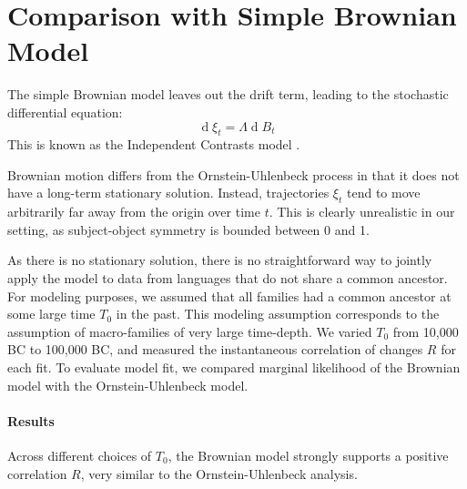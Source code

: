\documentclass[11pt,a4paper]{article}
\begin{document}



\section{Comparison with Simple Brownian Model}

The simple Brownian model leaves out the drift term, leading to the stochastic differential equation:
\begin{equation*}
    \operatorname{d}\xi_t = \Lambda \operatorname{d}B_t
\end{equation*}
This is known as the Independent Contrasts model \citep{felsenstein1973maximum, freckleton2012fast}.

Brownian motion differs from the Ornstein-Uhlenbeck process in that it does not have a long-term stationary solution.
Instead, trajectories $\xi_t$ tend to move arbitrarily far away from the origin over time $t$.
This is clearly unrealistic in our setting, as subject-object symmetry is bounded between 0 and 1.

As there is no stationary solution, there is no straightforward way to jointly apply the model to data from languages that do not share a common ancestor.
For modeling purposes, we assumed that all families had a common ancestor at some large time $T_0$ in the past.
This modeling assumption corresponds to the assumption of macro-families of very large time-depth.
We varied $T_0$ from 10,000 BC to 100,000 BC, and measured the instantaneous correlation of changes $R$ for each fit.
To evaluate model fit, we compared marginal likelihood of the Brownian model with the Ornstein-Uhlenbeck model.

\paragraph{Results}
Across different choices of $T_0$, the Brownian model strongly supports a positive correlation $R$, very similar to the Ornstein-Uhlenbeck analysis.
\end{document}
